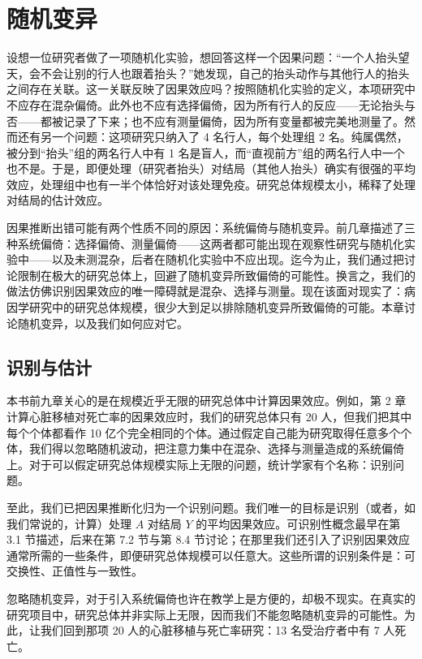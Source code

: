 \chapter{随机变异}

设想一位研究者做了一项随机化实验，想回答这样一个因果问题：“一个人抬头望天，会不会让别的行人也跟着抬头？”她发现，自己的抬头动作与其他行人的抬头之间存在关联。这一关联反映了因果效应吗？按照随机化实验的定义，本项研究中不应存在混杂偏倚。此外也不应有选择偏倚，因为所有行人的反应——无论抬头与否——都被记录了下来；也不应有测量偏倚，因为所有变量都被完美地测量了。然而还有另一个问题：这项研究只纳入了 4 名行人，每个处理组 2 名。纯属偶然，被分到“抬头”组的两名行人中有 1 名是盲人，而“直视前方”组的两名行人中一个也不是。于是，即便处理（研究者抬头）对结局（其他人抬头）确实有很强的平均效应，处理组中也有一半个体恰好对该处理免疫。研究总体规模太小，稀释了处理对结局的估计效应。

因果推断出错可能有两个性质不同的原因：系统偏倚与随机变异。前几章描述了三种系统偏倚：选择偏倚、测量偏倚——这两者都可能出现在观察性研究与随机化实验中——以及未测混杂，后者在随机化实验中不应出现。迄今为止，我们通过把讨论限制在极大的研究总体上，回避了随机变异所致偏倚的可能性。换言之，我们的做法仿佛识别因果效应的唯一障碍就是混杂、选择与测量。现在该面对现实了：病因学研究中的研究总体规模，很少大到足以排除随机变异所致偏倚的可能。本章讨论随机变异，以及我们如何应对它。

\section{识别与估计}

本书前九章关心的是在规模近乎无限的研究总体中计算因果效应。例如，第 2 章计算心脏移植对死亡率的因果效应时，我们的研究总体只有 20 人，但我们把其中每个个体都看作 10 亿个完全相同的个体。通过假定自己能为研究取得任意多个个体，我们得以忽略随机波动，把注意力集中在混杂、选择与测量造成的系统偏倚上。对于可以假定研究总体规模实际上无限的问题，统计学家有个名称：识别问题。

至此，我们已把因果推断化归为一个识别问题。我们唯一的目标是识别（或者，如我们常说的，计算）处理 $A$ 对结局 $Y$ 的平均因果效应。可识别性概念最早在第 3.1 节描述，后来在第 7.2 节与第 8.4 节讨论；在那里我们还引入了识别因果效应通常所需的一些条件，即便研究总体规模可以任意大。这些所谓的识别条件是：可交换性、正值性与一致性。

忽略随机变异，对于引入系统偏倚也许在教学上是方便的，却极不现实。在真实的研究项目中，研究总体并非实际上无限，因而我们不能忽略随机变异的可能性。为此，让我们回到那项 20 人的心脏移植与死亡率研究：13 名受治疗者中有 7 人死亡。

